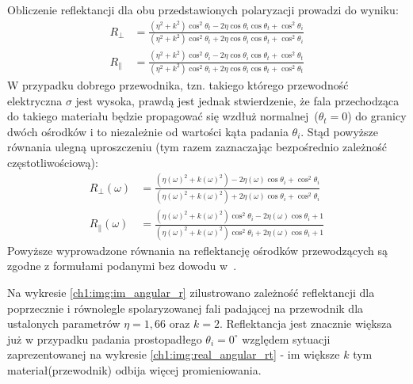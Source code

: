 Obliczenie reflektancji dla obu przedstawionych polaryzacji prowadzi do wyniku:
\begin{align}
\label{ch1:eq:RPerp_general}
R_\perp &= \frac{\left(\eta^2 + k^2\right)\cos^2\theta_t - 2\eta\cos\theta_i\cos\theta_t + \cos^2\theta_i}{\left(\eta^2 + k^2\right)\cos^2\theta_t + 2\eta\cos\theta_i\cos\theta_t + \cos^2\theta_i}\\
\label{ch1:eq:RParallel_general}
R_\parallel &= \frac{\left( \eta^2 + k^2 \right)\cos^2\theta_i - 2\eta\cos\theta_i\cos\theta_t + \cos^2\theta_t}{\left( \eta^2 + k^2 \right)\cos^2\theta_i + 2\eta\cos\theta_i\cos\theta_t + \cos^2\theta_t}
\end{align}
W przypadku dobrego przewodnika, tzn. takiego którego przewodność elektryczna $\sigma$ jest wysoka, prawdą jest jednak stwierdzenie, że fala przechodząca do takiego materiału będzie propagować się wzdłuż normalnej~($\theta_t = 0$) do granicy dwóch ośrodków i to niezależnie od wartości kąta padania $\theta_i$. Stąd powyższe równania ulegną uproszczeniu (tym razem zaznaczając bezpośrednio zależność częstotliwościową):
\begin{align}
\label{ch1:eq:RPerp_conductor}
R_\perp(\omega) &= \frac{\left(\eta(\omega)^2 + k(\omega)^2\right) - 2\eta(\omega)\cos\theta_i + \cos^2\theta_i}{\left(\eta(\omega)^2 + k(\omega)^2\right) + 2\eta(\omega)\cos\theta_i + \cos^2\theta_i}\\
\label{ch1:eq:RParallel_conductor}
R_\parallel(\omega) &= \frac{\left( \eta(\omega)^2 + k(\omega)^2 \right)\cos^2\theta_i - 2\eta(\omega)\cos\theta_i + 1}{\left( \eta(\omega)^2 + k(\omega)^2 \right)\cos^2\theta_i + 2\eta(\omega)\cos\theta_i + 1}
\end{align}
Powyższe wyprowadzone równania na reflektancję ośrodków przewodzących są zgodne z formułami podanymi bez dowodu w~\cite{PBRT}.

Na wykresie \ref{ch1:img:im_angular_r} zilustrowano zależność reflektancji dla poprzecznie i równolegle spolaryzowanej fali padającej na przewodnik dla ustalonych parametrów $\eta = 1,66$ oraz $k = 2$. Reflektancja jest znacznie większa już w przypadku padania prostopadłego $\theta_i = 0^\circ$ względem sytuacji zaprezentowanej na wykresie \ref{ch1:img:real_angular_rt} - im większe $k$ tym materiał(przewodnik) odbija więcej promieniowania. 

